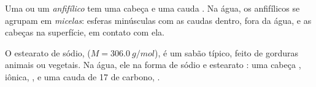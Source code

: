 \begin{definition}\label{def:g11:dissolution:amphiphilic}
Uma  ou um  \emph{anfifílico} tem uma cabeça
 e uma cauda . Na água, os  anfifílicos se
agrupam em \emph{micelas}: esferas minúsculas com as
caudas dentro, fora da água, e as cabeças na superfície, em contato com
ela.
\end{definition}

\begin{example}[Um sabão]\label{ex:g11:dissolution:soap}
O estearato de sódio,  ($M = \qty{306.0}{g/mol}$), é um
sabão típico, feito de gorduras animais ou vegetais. Na água, ele  na forma de  sódio  e  estearato
: uma cabeça , iônica, , e uma cauda
de 17  de carbono, .
\end{example}

